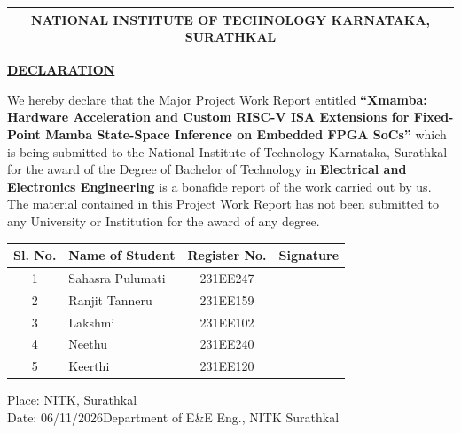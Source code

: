 \documentclass[11pt,a4paper,oneside]{report}
\begin{document}

\begin{center}
\begin{tabular}{c}
\textbf{\footnotesize{NATIONAL INSTITUTE OF TECHNOLOGY KARNATAKA, SURATHKAL}}\\\hline
\end{tabular}
\end{center}

\begin{mdframed}[linewidth=1.5pt]
\linespread{1.3}\selectfont
\vspace{0.3cm}

\begin{center}
\textbf{\underline{DECLARATION}}\\
\end{center}

\vspace{0.4cm}
We hereby declare that the Major Project Work Report entitled \textbf{``Xmamba: Hardware Acceleration and Custom RISC-V ISA Extensions for Fixed-Point Mamba State-Space Inference on Embedded FPGA SoCs''} which is being submitted to the National Institute of Technology Karnataka, Surathkal for the award of the Degree of Bachelor of Technology in \textbf{Electrical and Electronics Engineering} is a bonafide report of the work carried out by us. The material contained in this Project Work Report has not been submitted to any University or Institution for the award of any degree.

\vspace{0.5cm}
\begin{center}
\renewcommand{\arraystretch}{2.3}
\begin{tabular}{|c|l|c|p{4.6cm}|}
\hline
\textbf{Sl. No.} & \textbf{Name of Student} & \textbf{Register No.} & \centering\arraybackslash\textbf{Signature} \\ \hline
1 & Sahasra Pulumati & 231EE247 & \\ \hline
2 & Ranjit Tanneru & 231EE159 & \\ \hline
3 & Lakshmi & 231EE102 & \\ \hline
4 & Neethu & 231EE240 & \\ \hline
5 & Keerthi & 231EE120 & \\ \hline
\end{tabular}
\end{center}

\vspace{0.6cm}

\noindent Place: NITK, Surathkal\\
Date: 06/11/2026\hfill Department of E\&E Eng., NITK Surathkal
\end{mdframed}
\clearpage
\end{document}
